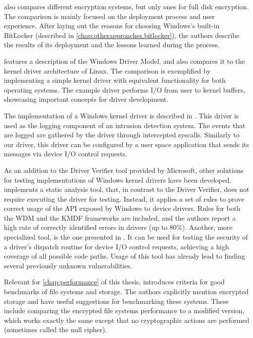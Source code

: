\cite{Lewis2018} also compares different encryption systems, but only ones for full disk encryption. The comparison is mainly focused on the deployment process and user experience. After laying out the reasons for choosing Windows's built-in BitLocker (described in \autoref{chap:otherapproaches.bitlocker}), the authors describe the results of its deployment and the lessons learned during the process.

\cite{Tsegaye2004} features a description of the Windows Driver Model, and also compares it to the kernel driver architecture of Linux. The comparison is exemplified by implementing a simple kernel driver with equivalent functionality for both operating systems. The example driver performs I/O from user to kernel buffers, showcasing important concepts for driver development.

The implementation of a Windows kernel driver is described in \cite{Battistoni2008}. This driver is used as the logging component of an intrusion detection system. The events that are logged are gathered by the driver through intercepted syscalls. Similarly to our driver, this driver can be configured by a user space application that sends its messages via device I/O control requests.

As an addition to the Driver Verifier tool provided by Microsoft, other solutions for testing implementations of Windows kernel drivers have been developed. \cite{Ball2006} implements a static analysis tool, that, in contrast to the Driver Verifier, does not require executing the driver for testing. Instead, it applies a set of rules to prove correct usage of the API exposed by Windows to device drivers. Rules for both the WDM and the KMDF frameworks are included, and the authors report a high rate of correctly identified errors in drivers (up to 80\%). Another, more specialized tool, is the one presented in \cite{Ni2012}. It can be used for testing the security of a driver's dispatch routine for device I/O control requests, achieving a high coverage of all possible code paths. Usage of this tool has already lead to finding several previously unknown vulnerabilities.

Relevant for \autoref{chap:performance} of this thesis, \cite{Traeger2008} introduces criteria for good benchmarks of file systems and storage. The authors explicitly mention encrypted storage and have useful suggestions for benchmarking these systems. These include comparing the encrypted file systems performance to a modified version, which works exactly the same except that no cryptographic actions are performed (sometimes called the null cipher).

